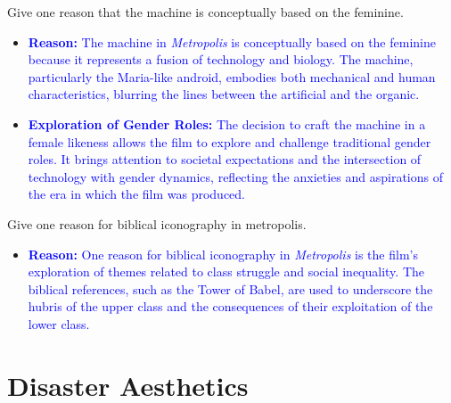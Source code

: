 \documentclass[11pt,fleqn]{book} %
\begin{document}
\begin{exercise}
    Give one reason that the machine is conceptually based on the feminine.
        \begin{itemize}
            \item \textcolor{blue}{\textbf{Reason:} The machine in \textit{Metropolis} is conceptually based on the feminine because it represents a fusion of technology and biology. The machine, particularly the Maria-like android, embodies both mechanical and human characteristics, blurring the lines between the artificial and the organic.}
            \item \textcolor{blue}{\textbf{Exploration of Gender Roles:} The decision to craft the machine in a female likeness allows the film to explore and challenge traditional gender roles. It brings attention to societal expectations and the intersection of technology with gender dynamics, reflecting the anxieties and aspirations of the era in which the film was produced.}
        \end{itemize}
\end{exercise}

\begin{exercise}
    Give one reason for biblical iconography in metropolis.
        \begin{itemize}
            \item \textcolor{blue}{\textbf{Reason:} One reason for biblical iconography in \textit{Metropolis} is the film's exploration of themes related to class struggle and social inequality. The biblical references, such as the Tower of Babel, are used to underscore the hubris of the upper class and the consequences of their exploitation of the lower class.}
        \end{itemize}
\end{exercise}


\section{Disaster Aesthetics}
\end{document}
